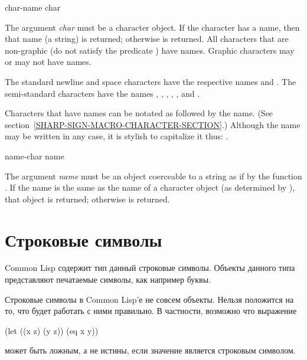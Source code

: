 \begin{defun}[Function]
char-name char

The argument \emph{char} must be a character object.
If the character has a name, then that name (a string) is returned;
otherwise {\false} is returned.  All characters that are non-graphic
(do not satisfy the predicate ) have names.
Graphic characters may or may not have names.

The standard newline and space characters have the respective
names  and .
The semi-standard characters have the names
, , , , , and .

Characters that have names can be notated as \cd{\#{\Xbackslash}} followed
by the name.  (See section~\ref{SHARP-SIGN-MACRO-CHARACTER-SECTION}.)
Although the name may be written in any case,
it is stylish to capitalize it thus: .
\end{defun}

\begin{defun}[Function]
name-char name

The argument \emph{name} must be an object coerceable to a string
as if by the function .
If the name is the same as the name of a character object
(as determined by ), that object
is returned; otherwise {\false} is returned.
\end{defun}

\else %

\chapter{Строковые символы}

Common Lisp содержит тип данный строковые символы. Объекты данного типа
представляют печатаемые символы, как например буквы. 

Строковые символы в Common Lisp'е не совсем объекты. Нельзя положится на то, что
 будет работать с ними правильно. В частности, возможно что выражение
\begin{lisp}
(let ((x z) (y z)) (eq x y))
\end{lisp}
может быть ложным, а не истины, если значение  является строковым
символом.

